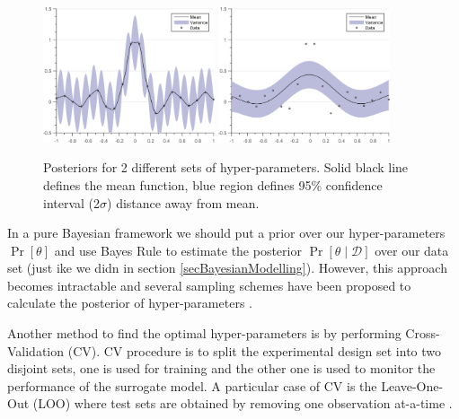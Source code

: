   \begin{figure}[!ht]
  \centering
    \subfigure[{Posterior between SE prior with hyper-parameters $(\theta = [0.35, 0.05]; \sigma_{noise} = 0.01)$ and data. }]
  {
        \includegraphics[width=0.45\textwidth]
        {images/part1/posteriorSE1}
        \label{subFigPosterior1}
  }\quad
\subfigure[{Posterior between SE prior with hyper-parameters $(\theta = [0.35, 0.5]; \sigma_{noise} = 0.01)$ and data. }]
  {
        \includegraphics[width=0.45\textwidth]
        {images/part1/posteriorSE3}
        \label{subFigPosterior3}
  }\quad
       \caption{Posteriors for 2 different sets of hyper-parameters. Solid black line defines the mean function, blue region defines 95\% confidence interval (2$\sigma$) distance away from mean. }\label{figGPRMarginal}
\end{figure}

In a pure Bayesian framework we should put a prior over our hyper-parameters $\Pr[\theta]$ and use Bayes Rule to estimate the posterior $\Pr[\theta \mid \mathcal{D}]$ over our data set (just ike we didn in section \ref{secBayesianModelling}). However, this approach becomes intractable and several sampling schemes have been proposed to calculate the posterior of hyper-parameters \cite{osborne2010bayesian, neal2011mcmc}.

Another method to find the optimal hyper-parameters is by performing Cross-Validation (CV). CV procedure is to split the experimental design set into two disjoint sets, one is used for training and the other one is used to monitor the performance of the surrogate model. A particular case of CV is the Leave-One-Out (LOO) where test sets are obtained by removing one observation at-a-time \cite{rasmussen2006gaussian, dubrule1983cross, le2013multi}. 

